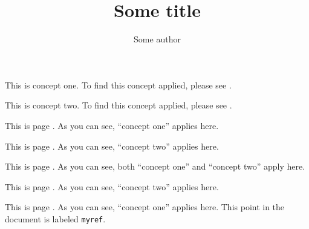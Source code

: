 \documentclass{article}
\begin{document}
\title{Some title}

\author{Some author}

\maketitle

This is concept one. To find this concept applied, please
see .

This is concept two. To find this concept applied, please
see .\newpage

This is page \thepage. As you can see, ``concept
one'' applies here.\newpage

This is page \thepage. As you can see, ``concept
two'' applies here.\newpage

This is page \thepage. As you
can see, both ``concept one'' and ``concept two'' apply here.\newpage

This is page \thepage. As you can see, ``concept
two'' applies here.\newpage

This is page \thepage. As you can
see, ``concept one'' applies here. This point in the document is
labeled \texttt{myref}.
\end{document}
